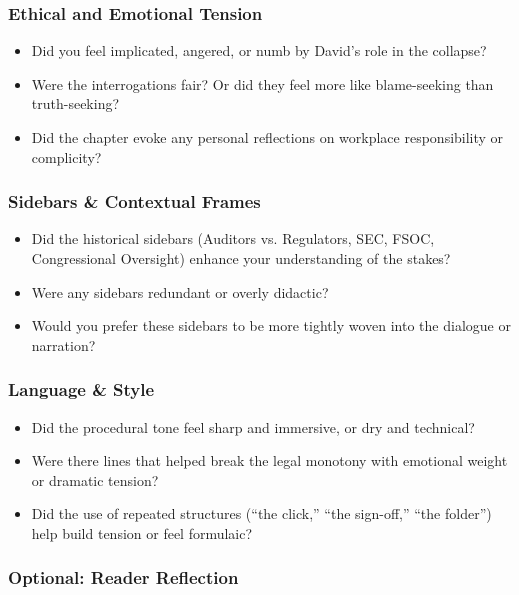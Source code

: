 \subsubsection{Ethical and Emotional Tension}

\begin{itemize}
  \item Did you feel implicated, angered, or numb by David’s role in the collapse?
  \item Were the interrogations fair? Or did they feel more like blame-seeking than truth-seeking?
  \item Did the chapter evoke any personal reflections on workplace responsibility or complicity?
\end{itemize}

\subsubsection{Sidebars \& Contextual Frames}

\begin{itemize}
  \item Did the historical sidebars (Auditors vs. Regulators, SEC, FSOC, Congressional Oversight) enhance your understanding of the stakes?
  \item Were any sidebars redundant or overly didactic?
  \item Would you prefer these sidebars to be more tightly woven into the dialogue or narration?
\end{itemize}

\subsubsection{Language \& Style}

\begin{itemize}
  \item Did the procedural tone feel sharp and immersive, or dry and technical?
  \item Were there lines that helped break the legal monotony with emotional weight or dramatic tension?
  \item Did the use of repeated structures (“the click,” “the sign-off,” “the folder”) help build tension or feel formulaic?
\end{itemize}

\subsubsection{Optional: Reader Reflection}

